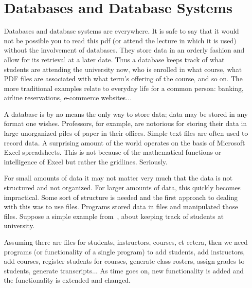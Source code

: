 




\section*{Databases and Database Systems}

Databases and database systems are everywhere. It is safe to say that it would not be possible you to read this pdf (or attend the lecture in which it is used) without the involvement of databases. They store data in an orderly fashion and allow for its retrieval at a later date. Thus a database keeps track of what students are attending the university now, who is enrolled in what course, what PDF files are associated with what term's offering of the course, and so on. The more traditional examples relate to everyday life for a common person: banking, airline reservations, e-commerce websites...

A database is by no means the only way to store data; data may be stored in any format one wishes. Professors, for example, are notorious for storing their data in large unorganized piles of paper in their offices. Simple text files are often used to record data. A surprising amount of the world operates on the basis of Microsoft Excel spreadsheets. This is not because of the mathematical functions or intelligence of Excel but rather the gridlines. Seriously.

For small amounts of data it may not matter very much that the data is not structured and not organized. For larger amounts of data, this quickly becomes impractical. Some sort of structure is needed and the first approach to dealing with this was to use files. Programs stored data in files and manipulated those files. Suppose a simple example from~\cite{dsc}, about keeping track of students at university.

Assuming there are files for students, instructors, courses, et cetera, then we need programs (or functionality of a single program) to add students, add instructors, add courses, register students for courses, generate class rosters, assign grades to students, generate transcripts... As time goes on, new functionality is added and the functionality is extended and changed.

